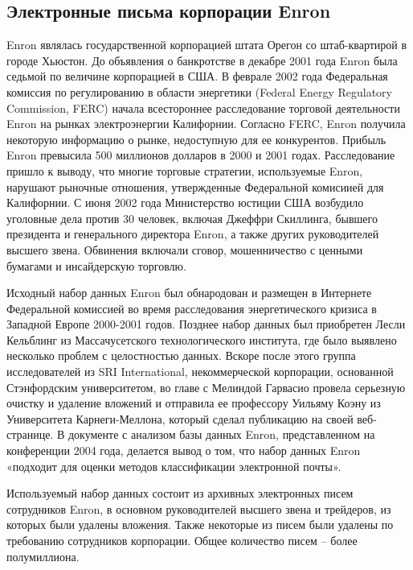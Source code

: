 \subsection{Электронные письма корпорации Enron}

Enron являлась государственной корпорацией штата Орегон со штаб-квартирой в городе Хьюстон. До объявления о банкротстве в декабре 2001 года Enron была седьмой по величине корпорацией в США. В феврале 2002 года Федеральная комиссия по регулированию в области энергетики (Federal Energy Regulatory Commission, FERC) начала всестороннее расследование торговой деятельности Enron на рынках электроэнергии Калифорнии. Согласно FERC, Enron получила некоторую информацию о рынке, недоступную для ее конкурентов. Прибыль Enron превысила 500 миллионов долларов в 2000 и 2001 годах. Расследование пришло к выводу, что многие торговые стратегии, используемые Enron, нарушают рыночные отношения, утвержденные Федеральной комисиией для Калифорнии. С июня 2002 года Министерство юстиции США возбудило уголовные дела против 30 человек, включая Джеффри Скиллинга, бывшего президента и генерального директора Enron, а также других руководителей высшего звена. Обвинения включали сговор, мошенничество с ценными бумагами и инсайдерскую торговлю.

Исходный набор данных Enron был обнародован и размещен в Интернете Федеральной комиссией во время расследования энергетического кризиса в Западной Европе 2000-2001 годов. Позднее набор данных был приобретен Лесли Кельблинг из Массачусетского технологического института, где было выявлено несколько проблем с целостностью данных. Вскоре после этого группа исследователей из SRI International, некоммерческой корпорации, основанной Стэнфордским университетом, во главе с Мелиндой Гарвасио провела серьезную очистку и удаление вложений и отправила ее профессору Уильяму Коэну из Университета Карнеги-Меллона, который сделал публикацию на своей веб-странице. В документе с анализом базы данных Enron, представленном на конференции 2004 года, делается вывод о том, что набор данных Enron «подходит для оценки методов классификации электронной почты».

Используемый набор данных состоит из архивных электронных писем сотрудников Enron, в основном  руководителей высшего звена и трейдеров, из которых были удалены вложения. Также некоторые из писем были удалены по требованию сотрудников корпорации. Общее количество писем -- более полумиллиона.